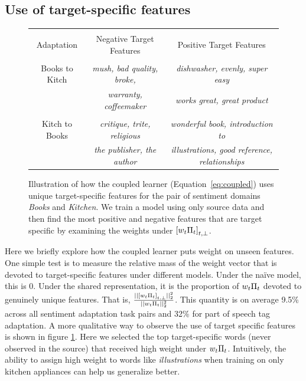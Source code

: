 \subsection{Use of target-specific features}
\label{sec:newnorm}

\begin{figure}
\begin{center}
\begin{tabular}{|c|c|c|}
\hline
\vspace{-0.14in}\\
Adaptation & Negative Target Features & Positive Target Features \\
\hline
\vspace{-0.14in}\\
Books to Kitch & \emph{mush, bad quality, broke,} & \emph{dishwasher, evenly, super easy} \\ 
& \emph{warranty, coffeemaker} & \emph{works great, great product}\\
\hline
\vspace{-0.14in}\\
Kitch to Books & \emph{critique, trite, religious} & \emph{wonderful book, introduction to} \\
& \emph{the publisher, the author} & \emph{illustrations, good reference, relationships} \\
\hline
\end{tabular}
\end{center}
\label{fig:target-specific}
\caption{Illustration of how the coupled learner
  (Equation~\ref{eq:coupled}) uses unique target-specific features for the
  pair of sentiment domains \emph{Books} and \emph{Kitchen}.  We train
  a model using only source data and then find the most positive and
  negative features that are target specific by examining the weights
  under $\left[w_{t}\Pi_t\right]_{t,\perp}$.}
\end{figure}

Here we briefly explore how the coupled learner puts weight on unseen
features.  One simple test is to measure the relative mass of the
weight vector that is devoted to target-specific features under
different models.  Under the na\"{i}ve model, this is 0.  Under the
shared representation, it is the proportion of $w_{t}\Pi_t$ devoted
to genuinely unique features.  That is, $\frac{||\left[w_{t}\Pi_t\right]_{t,\perp}||^{2}_{2}}{||w_{t} \Pi_t||^{2}_{2}}$.  This quantity
is on average 9.5\% across all sentiment adaptation task pairs and
32\% for part of speech tag adaptation.  A more qualitative way to
observe the use of target specific features is shown in figure
\ref{fig:target-specific}.  Here we selected the top target-specific
words (never observed in the source) that received high weight under
$w_{t}\Pi_t$.  Intuitively, the ability to assign high weight to
words like \emph{illustrations} when training on only kitchen
appliances can help us generalize better.

